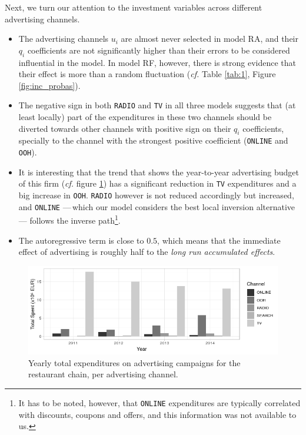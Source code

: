 Next, we turn our attention to the investment variables across different advertising channels.

\begin{itemize}

\item The advertising channels $u_i$ are almost never selected in model RA, and their $q_i$ coefficients are not significantly higher than their errors to be considered influential in the model. In model RF, however, there is strong evidence that their effect is more than a random fluctuation (\emph{cf.} Table \ref{tab:1}, Figure \ref{fig:inc_probas}). 
\item The negative sign in both \texttt{RADIO} and \texttt{TV} in all three models suggests that (at least locally) part of the expenditures in these two channels should be diverted towards other channels with positive sign on their $q_i$ coefficients, specially to the channel with the strongest positive coefficient (\texttt{ONLINE} and \texttt{OOH}).
\item It is interesting that the trend that shows the year-to-year advertising budget of this firm (\emph{cf.} figure \ref{fig:yearly}) has a significant reduction in \texttt{TV} expenditures and a big increase in \texttt{OOH}. \texttt{RADIO} however is not reduced accordingly but increased, and \texttt{ONLINE} ---\,which our model considers the best local inversion alternative\,--- follows the inverse path\footnote{It has to be noted, however, that \texttt{ONLINE} expenditures are typically correlated with discounts, coupons and offers, and this information was not available to us.}.
\item The autoregressive term is close to $0.5$, which means that the immediate effect of advertising is roughly half to the \textit{long run accumulated effects}.
\end{itemize}


\begin{figure}[h]
\centering
\includegraphics[scale=0.75]{figures/anuales}
\caption{Yearly total expenditures on advertising campaigns for the restaurant chain, per advertising channel.}\label{fig:yearly}
\end{figure}






